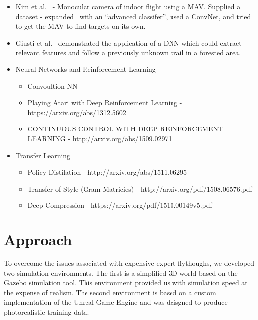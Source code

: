 \documentclass[paper=a4, fontsize=11pt]{scrartcl} %
\begin{document}
\begin{itemize}
\begin{itemize}
\begin{itemize}
				\item Kim et al.~\cite{Kim2015} - Monocular camera of indoor flight using a MAV.  Supplied a dataset - expanded~\cite{Ross2013} with an ``advanced classifer'', used a ConvNet, and tried to get the MAV to find targets on its own.
				\item Giusti et al.~\cite{Guisti2016} demonstrated the application of a DNN which could extract relevant features and follow a previously unknown trail in a forested area.
			\end{itemize}
		\end{itemize}
		\begin{itemize}
			\item Neural Networks and Reinforcement Learning
			\begin{itemize}
				\item Convoultion NN
				\item Playing Atari with Deep Reinforcement Learning - https://arxiv.org/abs/1312.5602
				\item CONTINUOUS CONTROL WITH DEEP REINFORCEMENT LEARNING - http://arxiv.org/abs/1509.02971
			\end{itemize}
		\end{itemize}
		\begin{itemize}
			\item Transfer Learning
			\begin{itemize}
				\item Policy Distilation - http://arxiv.org/abs/1511.06295
				\item Transfer of Style (Gram Matricies) - http://arxiv.org/pdf/1508.06576.pdf
				\item Deep Compression - https://arxiv.org/pdf/1510.00149v5.pdf
			\end{itemize}
		\end{itemize}
	\end{itemize}

\section{Approach} 

	To overcome the issues associated with expensive expert flythoughs, we developed two simulation environments. The first is a simplified 3D world based on
	the Gazebo simulation tool. This environment provided us with simulation speed at the expense of realism. The second environment is based on a custom implementation of the Unreal Game Engine and was deisgned to produce photorealistic training data.
\end{document}
